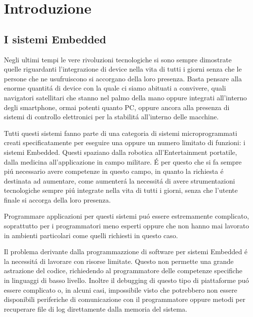 \chapter{Introduzione}
\section{I sistemi Embedded}
Negli ultimi tempi le vere rivoluzioni tecnologiche si sono sempre
dimostrate quelle riguardanti l'integrazione di device nella vita di tutti
i giorni senza che le persone che ne usufruiscono si accorgano della loro
presenza. Basta pensare alla enorme quantit\'a di device con la quale ci
siamo abituati a convivere, quali navigatori satellitari che stanno nel
palmo della mano oppure integrati all'interno degli smartphone, ormai
potenti quanto PC, oppure ancora alla presenza di sistemi di controllo
elettronici per la stabilit\'a all'interno delle macchine.

Tutti questi sistemi fanno parte di una categoria di sistemi
microprogrammati creati specificatamente per eseguire una oppure un numero
limitato di funzioni: i sistemi Embedded. Questi spaziano dalla robotica
all'Entertainment portatile, dalla medicina all'applicazione in campo
militare. \'E per questo che si fa sempre pi\'u necessario avere competenze
in questo campo, in quanto la richiesta \'e destinata ad aumentare,
come aumenter\'a la necessit\'a di avere strumentazioni tecnologiche sempre
pi\'u integrate nella vita di tutti i giorni, senza che l'utente finale si
accorga della loro presenza.

Programmare applicazioni per questi sistemi pu\'o essere
estremamente complicato, soprattutto per i programmatori meno esperti
oppure che non hanno mai lavorato in ambienti particolari come quelli
richiesti in questo caso.

 Il problema derivante dalla programmazzione di software per
sistemi Embedded \'e la necessit\'a di lavorare con risorse limitate.
Questo non permette una grande astrazione del codice, richiedendo al
programmatore delle competenze specifiche in linguaggi di basso livello.
Inoltre il debugging di questo tipo di piattaforme pu\'o essere complicato
o, in alcuni casi, impossibile visto che potrebbero non essere disponibili
periferiche di comunicazione con il programmatore oppure metodi per
recuperare file di log direttamente dalla memoria del sistema.

